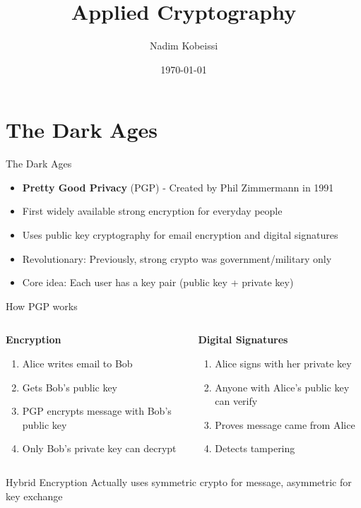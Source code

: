 \documentclass[aspectratio=169, lualatex, handout]{beamer}
\title{Applied Cryptography}
\author{Nadim Kobeissi}
\institute{American University of Beirut}
\date{\today}
\begin{document}
\begin{frame}[plain]
	\titlepage
\end{frame}

\section{The Dark Ages}

\begin{frame}{The Dark Ages}
	\begin{itemize}
		\item \textbf{Pretty Good Privacy} (PGP) - Created by Phil Zimmermann in 1991
		\item First widely available strong encryption for everyday people
		\item Uses public key cryptography for email encryption and digital signatures
		\item Revolutionary: Previously, strong crypto was government/military only
		\item Core idea: Each user has a key pair (public key + private key)
	\end{itemize}
\end{frame}

\begin{frame}{How PGP works}
	\begin{columns}
		\begin{column}{0.5\textwidth}
			\textbf{Encryption}
			\begin{enumerate}
				\item Alice writes email to Bob
				\item Gets Bob's public key
				\item PGP encrypts message with Bob's public key
				\item Only Bob's private key can decrypt
			\end{enumerate}
		\end{column}
		\begin{column}{0.5\textwidth}
			\textbf{Digital Signatures}
			\begin{enumerate}
				\item Alice signs with her private key
				\item Anyone with Alice's public key can verify
				\item Proves message came from Alice
				\item Detects tampering
			\end{enumerate}
		\end{column}
	\end{columns}
	\begin{alertblock}{Hybrid Encryption}
		Actually uses symmetric crypto for message, asymmetric for key exchange
	\end{alertblock}
\end{frame}
\end{document}
